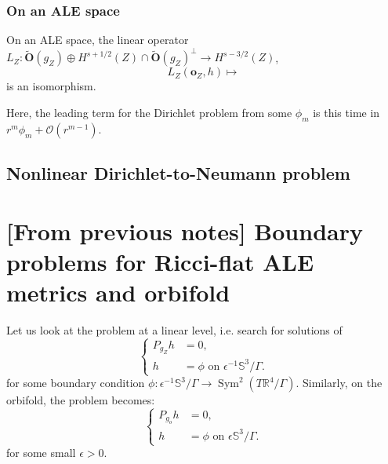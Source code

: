 \documentclass[12pt]{article}
\begin{document}
    
    \subsubsection{On an ALE space}
    
    On an ALE space, the linear operator $L_Z:\tilde{\mathbf{O}}(g_Z)\oplus H^{s+1/2}(Z)\cap \tilde{\mathbf{O}}(g_Z)^\perp\to H^{s-3/2}(Z)$,
    $$ L_Z(\mathbf{o}_Z,h)\mapsto  $$
    is an isomorphism. 
    
    
    Here, the leading term for the Dirichlet problem from some $\phi_m$ is this time in $r^m\phi_m + \mathcal{O}(r^{m-1})$. 
    
    \subsection{Nonlinear Dirichlet-to-Neumann problem}
    
    
    
      
   \section{[From previous notes] Boundary problems for Ricci-flat ALE metrics and orbifold}
   
   Let us look at the problem at a linear level, i.e. search for solutions of 
   \begin{equation}
       \left\{\begin{aligned}
            P_{g_Z} h &=0,\\
            h &= \phi \text{ on } \epsilon^{-1}\mathbb{S}^3\slash\Gamma.
       \end{aligned}\right.\label{boundary ALE}
   \end{equation}
   for some boundary condition $\phi: \epsilon^{-1}\mathbb{S}^3\slash\Gamma \to \operatorname{Sym}^2(T\mathbb{R}^4\slash\Gamma)$. Similarly, on the orbifold, the problem becomes:
   \begin{equation}
       \left\{\begin{aligned}
            P_{g_o} h &=0,\\
            h &= \phi \text{ on } \epsilon\mathbb{S}^3\slash\Gamma.
       \end{aligned}\right.\label{boundary orb}
   \end{equation}
   for some small $\epsilon>0$. 
   
\end{document}
